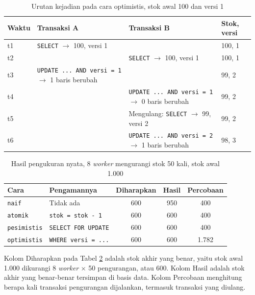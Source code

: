 \begin{table}[!htb]
  \centering
  \caption{Urutan kejadian pada cara optimistis, stok awal 100 dan versi 1}
  \label{tab:optimistis}
  \begin{tabularx}{\textwidth}{lXXl}
    \hline
    \textbf{Waktu} & \textbf{Transaksi A} & \textbf{Transaksi B} & \textbf{Stok, versi} \\
    \hline
    t1 & \texttt{SELECT} $\rightarrow$ 100, versi 1 & & 100, 1 \\
    \hline
    t2 & & \texttt{SELECT} $\rightarrow$ 100, versi 1 & 100, 1 \\
    \hline
    t3 & \texttt{UPDATE ... AND versi = 1} $\rightarrow$ 1 baris berubah & & 99, 2 \\
    \hline
    t4 & & \texttt{UPDATE ... AND versi = 1} $\rightarrow$ 0 baris berubah & 99, 2 \\
    \hline
    t5 & & Mengulang: \texttt{SELECT} $\rightarrow$ 99, versi 2 & 99, 2 \\
    \hline
    t6 & & \texttt{UPDATE ... AND versi = 2} $\rightarrow$ 1 baris berubah & 98, 3 \\
    \hline
  \end{tabularx}
\end{table}

\begin{table}[!htb]
  \centering
  \caption{Hasil pengukuran nyata, 8 \textit{worker} mengurangi stok 50 kali,
           stok awal 1.000}
  \label{tab:hasil-konkuren}
  \begin{tabularx}{\textwidth}{lXccc}
    \hline
    \textbf{Cara} & \textbf{Pengamannya} & \textbf{Diharapkan} & \textbf{Hasil} & \textbf{Percobaan} \\
    \hline
    \texttt{naif}       & Tidak ada                 & 600 & 950 & 400 \\
    \hline
    \texttt{atomik}     & \texttt{stok = stok - 1}  & 600 & 600 & 400 \\
    \hline
    \texttt{pesimistis} & \texttt{SELECT FOR UPDATE} & 600 & 600 & 400 \\
    \hline
    \texttt{optimistis} & \texttt{WHERE versi = ...} & 600 & 600 & 1.782 \\
    \hline
  \end{tabularx}
\end{table}

Kolom Diharapkan pada Tabel \ref{tab:hasil-konkuren} adalah stok akhir yang
benar, yaitu stok awal 1.000 dikurangi 8 \textit{worker} $\times$ 50
pengurangan, atau 600. Kolom Hasil adalah stok akhir yang benar-benar
tersimpan di basis data. Kolom Percobaan menghitung berapa kali transaksi
pengurangan dijalankan, termasuk transaksi yang diulang.

